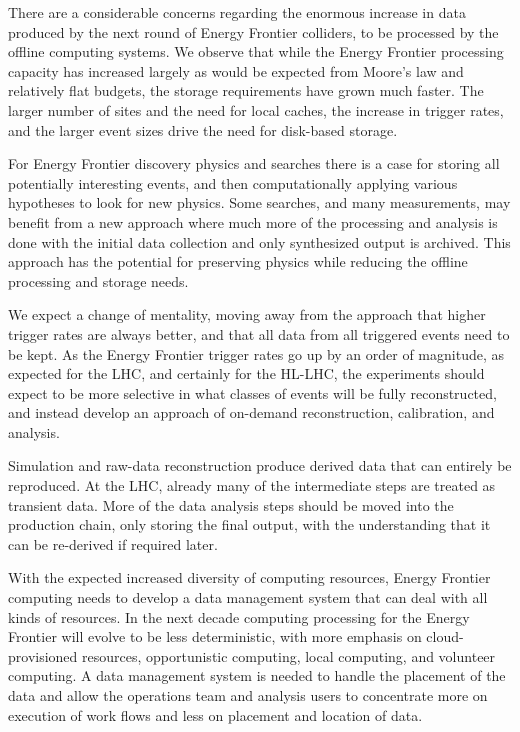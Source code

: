 There are a considerable concerns regarding the enormous increase in data
produced by the next round of Energy Frontier colliders,   to be processed by the offline
computing systems.  We observe that while the Energy Frontier processing capacity has
increased largely as would be expected from Moore's law and relatively
flat budgets, the storage requirements have grown much faster.  The larger
number of sites and the need for local caches, the increase in trigger rates,
and the larger event sizes drive the need for disk-based storage.

For Energy Frontier discovery physics and searches there is a case for storing all
potentially interesting events, and then computationally  applying various
hypotheses to look for new physics.  
Some searches, and many measurements, may benefit from a
new approach where much more of the processing and analysis is done with the
initial data collection and only synthesized output is archived.
This approach has the
potential for preserving physics while reducing the offline processing and
storage needs.  

We expect a change of mentality, moving away from the approach that higher
trigger rates are always better, and that all data from  all triggered events
need to be kept.   As the Energy Frontier trigger rates go up by an order of magnitude,  as
expected for the LHC, and certainly for the HL-LHC,  the experiments
should expect to be more selective in what classes of events will be fully
reconstructed,  and instead develop an approach of on-demand reconstruction,
calibration, and analysis.

Simulation and raw-data reconstruction produce derived data that can
entirely be reproduced. At the LHC, already many of the intermediate steps are
treated as transient data.   More of the data analysis steps should be moved
into the production chain, only storing the final output, with the
understanding that it can be re-derived if required later.

With the expected increased diversity of computing resources, Energy Frontier computing
needs to develop a data management system that can deal with all kinds of
resources.   In the next decade computing processing for the Energy Frontier will evolve to
be less deterministic, with more emphasis on cloud-provisioned resources,
opportunistic computing, local computing, and volunteer computing.   A data
management system is needed to handle the placement of the data and allow the
operations team and analysis users to concentrate more on execution of work
flows and less on placement and location of data.

